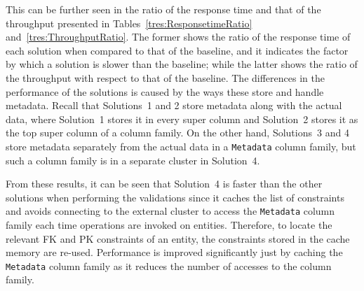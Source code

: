 
This can be further seen in the ratio of the response time and that of the
throughput presented in Tables~\ref{tres:ResponsetimeRatio}
and~\ref{tres:ThroughputRatio}.
The former shows the ratio of the response time of each solution when compared
to that of the baseline,  and it indicates the factor by which a solution is
slower than the baseline;  while
the latter shows the ratio of the throughput with respect to that of the
baseline.
The differences in the performance of the solutions is caused by the ways these
store and handle metadata.  Recall that Solutions~1 and 2 store metadata along
with the actual data, where Solution~1 stores it in every super column and
Solution~2 stores it as the top super column of a column family.  On the other
hand, Solutions~3 and 4 store metadata separately from the actual data  in a \texttt{Metadata}
column family, but such a column family is in a separate
cluster in Solution~4.

From these results,  it can be seen that Solution~4  is faster than the other
solutions when performing the validations  since it caches the list of
constraints and avoids connecting to the external cluster to access the
\texttt{Metadata} column family each time  operations are invoked on entities. 
Therefore,  to locate the relevant \ac{FK} and \ac{PK} constraints of an entity, 
the constraints stored in the cache memory are re-used. 
Performance is improved significantly just by caching the 
\texttt{Metadata} column family as it reduces the number of accesses to the
column family. 

